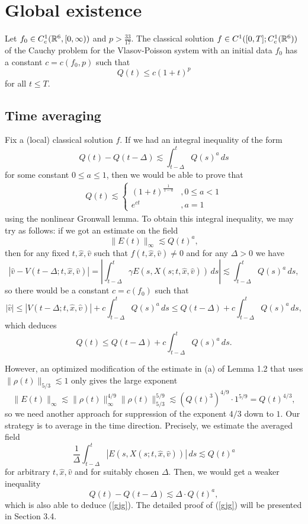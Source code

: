 \documentclass{article}
\begin{document}
\section{Global existence}



\begin{thm*}[Schaeffer, 1991]
Let $f_0\in C_c^1(\mathbb{R}^6,[0,\infty))$ and $p>\frac{33}{17}$.
The classical solution $f\in C^1([0,T];C_c^1(\mathbb{R}^6))$ of the Cauchy problem for the Vlasov-Poisson system with an initial data $f_0$ has a constant $c=c(f_0,p)$ such that
\[Q(t)\le c(1+t)^p\]
for all $t\le T$.
\end{thm*}

\subsection{Time averaging}
Fix a (local) classical solution $f$.
If we had an integral inequality of the form
\[Q(t)-Q(t-\Delta)\lesssim\int_{t-\Delta}^tQ(s)^a\,ds\]
for some constant $0\le a\le1$, then we would be able to prove that
\begin{align}\label{gjg}
Q(t)\lesssim\begin{cases}(1+t)^{\frac1{1-a}}&,0\le a<1\\e^{ct}&,a=1\end{cases}
\end{align}
using the nonlinear Gronwall lemma.
To obtain this integral inequality, we may try as follows: if we got an estimate on the field
\[\|E(t)\|_\infty\lesssim Q(t)^a,\]
then for any fixed $t,\hat x,\hat v$ such that $f(t,\hat x,\hat v)\ne0$ and for any $\Delta>0$ we have
\[|\hat v-V(t-\Delta;t,\hat x,\hat v)|=|\int_{t-\Delta}^t\gamma E(s,X(s;t,\hat x,\hat v))\,ds|\lesssim\int_{t-\Delta}^tQ(s)^a\,ds,\]
so there would be a constant $c=c(f_0)$ such that
\[|\hat v|\le|V(t-\Delta;t,\hat x,\hat v)|+c\int_{t-\Delta}^tQ(s)^a\,ds\le Q(t-\Delta)+c\int_{t-\Delta}^tQ(s)^a\,ds,\]
which deduces
\[Q(t)\le Q(t-\Delta)+c\int_{t-\Delta}^tQ(s)^a\,ds.\]

However, an optimized modification of the estimate in (a) of Lemma 1.2 that uses $\|\rho(t)\|_{5/3}\lesssim1$ only gives the large exponent
\[\|E(t)\|_\infty\lesssim\|\rho(t)\|_\infty^{4/9}\|\rho(t)\|_{5/3}^{5/9}\lesssim(Q(t)^3)^{4/9}\cdot1^{5/9}=Q(t)^{4/3},\]
so we need another approach for suppression of the exponent $4/3$ down to $1$.
Our strategy is to average in the time direction.
Precisely, we estimate the averaged field
\[\frac1\Delta\int_{t-\Delta}^t|E(s,X(s;t,\hat x,\hat v))|\,ds\lesssim Q(t)^a\]
for arbitrary $t,\hat x,\hat v$ and for suitably chosen $\Delta$.
Then, we would get a weaker inequality
\[Q(t)-Q(t-\Delta)\lesssim \Delta\cdot Q(t)^a,\]
which is also able to deduce (\ref{gjg}).
The detailed proof of (\ref{gjg}) will be presented in Section 3.4.
\end{document}
